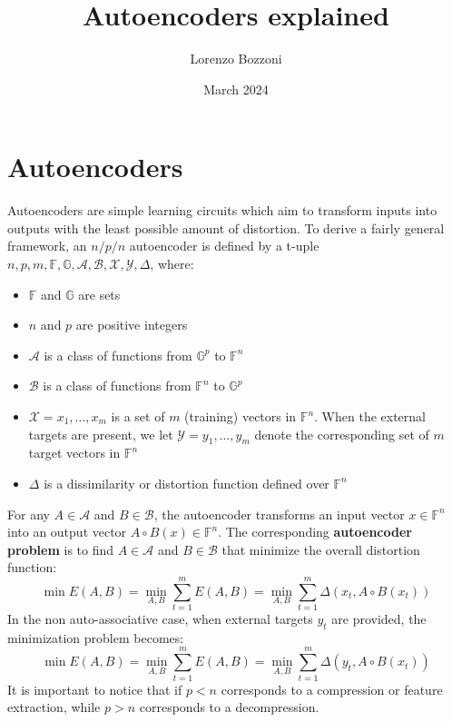 \documentclass{article}
\title{Autoencoders explained}
\author{Lorenzo Bozzoni}
\date{March 2024}
\begin{document}
\maketitle
\tableofcontents

\section{Autoencoders}
Autoencoders are simple learning circuits which aim to transform inputs into outputs with
the least possible amount of distortion. To derive a fairly general framework, an $n/p/n$  autoencoder is defined by a t-uple $n,p,m,\mathbb{F},\mathbb{G},\mathcal{A},\mathcal{B},\mathcal{X},\mathcal{Y}, \Delta$, where:
\begin{itemize}
    \item $\mathbb{F}$ and $\mathbb{G}$ are sets
    \item $n$ and $p$ are positive integers
    \item $\mathcal{A}$ is a class of functions from $\mathbb{G}^p$ to $\mathbb{F}^n$
    \item $\mathcal{B}$ is a class of functions from $\mathbb{F}^n$ to $\mathbb{G}^p$
    \item $\mathcal{X} = {x_1, \dots, x_m}$ is a set of $m$ (training) vectors in $\mathbb{F}^n$. When the external targets are present, we let $\mathcal{Y} = {y_1, \dots, y_m}$ denote the corresponding set of $m$ target vectors in $\mathbb{F}^n$ 
    \item $\Delta$ is a dissimilarity or distortion function defined over $\mathbb{F}^n$
\end{itemize}
For any $A \in \mathcal{A}$ and $B \in \mathcal{B}$, the autoencoder transforms an input vector $x \in \mathbb{F}^n$ into an output vector $A \circ B(x) \in \mathbb{F}^n$. The corresponding \textbf{autoencoder problem} is to find $A \in \mathcal{A}$ and $B \in \mathcal{B}$ that minimize the overall distortion function:
\begin{equation}
    \min E(A,B) = \min_{A ,B} \sum_{t=1}^m E(A,B)=\min_{A ,B} \sum_{t=1}^m \Delta(x_t, A \circ B(x_t))
\end{equation}
In the non auto-associative case, when external targets $y_t$ are provided, the minimization
problem becomes:
\begin{equation}
    \min E(A,B) = \min_{A ,B} \sum_{t=1}^m E(A,B)=\min_{A ,B} \sum_{t=1}^m \Delta(y_t, A \circ B(x_t))
\end{equation}
It is important to notice that if $p < n$ corresponds to a compression or feature extraction, while $p > n$ corresponds to a decompression. 



\end{document}
